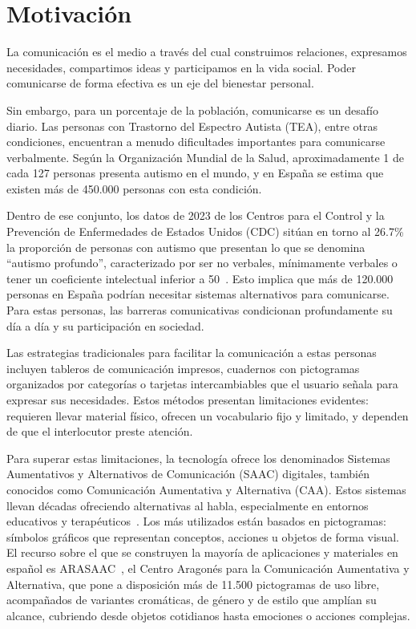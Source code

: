 
\section{Motivación}

La comunicación es el medio a través del cual construimos relaciones, expresamos necesidades, compartimos ideas y participamos en la vida social. Poder comunicarse de forma efectiva es un eje del bienestar personal.

Sin embargo, para un porcentaje de la población, comunicarse es un desafío diario. Las personas con Trastorno del Espectro Autista (TEA), entre otras condiciones, encuentran a menudo dificultades importantes para comunicarse verbalmente. Según la Organización Mundial de la Salud, aproximadamente 1 de cada 127 personas presenta autismo en el mundo, y en España se estima que existen más de 450.000 personas con esta condición.

Dentro de ese conjunto, los datos de 2023 de los Centros para el Control y la Prevención de Enfermedades de Estados Unidos (CDC) sitúan en torno al 26.7\% la proporción de personas con autismo que presentan lo que se denomina ``autismo profundo'', caracterizado por ser no verbales, mínimamente verbales o tener un coeficiente intelectual inferior a 50~\cite{cdc2023profound}. Esto implica que más de 120.000 personas en España podrían necesitar sistemas alternativos para comunicarse. Para estas personas, las barreras comunicativas condicionan profundamente su día a día y su participación en sociedad.

Las estrategias tradicionales para facilitar la comunicación a estas personas incluyen tableros de comunicación impresos, cuadernos con pictogramas organizados por categorías o tarjetas intercambiables que el usuario señala para expresar sus necesidades. Estos métodos presentan limitaciones evidentes: requieren llevar material físico, ofrecen un vocabulario fijo y limitado, y dependen de que el interlocutor preste atención.

Para superar estas limitaciones, la tecnología ofrece los denominados Sistemas Aumentativos y Alternativos de Comunicación (SAAC) digitales, también conocidos como Comunicación Aumentativa y Alternativa (CAA). Estos sistemas llevan décadas ofreciendo alternativas al habla, especialmente en entornos educativos y terapéuticos~\cite{demasco1992compansion}. Los más utilizados están basados en pictogramas: símbolos gráficos que representan conceptos, acciones u objetos de forma visual. El recurso sobre el que se construyen la mayoría de aplicaciones y materiales en español es ARASAAC~\cite{arasaac}, el Centro Aragonés para la Comunicación Aumentativa y Alternativa, que pone a disposición más de 11.500 pictogramas de uso libre, acompañados de variantes cromáticas, de género y de estilo que amplían su alcance, cubriendo desde objetos cotidianos hasta emociones o acciones complejas.

